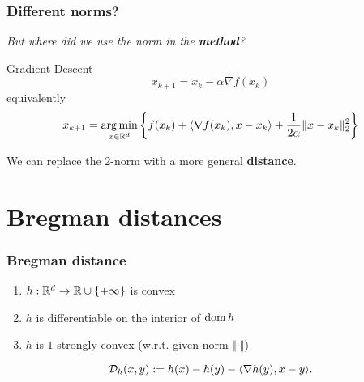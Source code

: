\documentclass{beamer}
\begin{document}
\begin{frame}
  \frametitle{Different norms?}
  \begin{center}
    \textit{But where did we use the norm in the \textbf{method}?}
  \end{center}

  \begin{block}{Gradient Descent}
    \begin{equation}
      x_{k+1} = x_k - \alpha \nabla f(x_k)
    \end{equation}
    equivalently
    \begin{equation}
      x_{k+1} = \operatorname*{arg\,min}_{x \in \mathbb{R}^d} \left\{ f(x_k) + \langle \nabla f(x_k), x-x_k \rangle + \frac{1}{2 \alpha} \Vert x-x_k  \Vert_2^2 \right\}
    \end{equation}
  \end{block}
  We can replace the $2$-norm with a more general \textbf{distance}.
\end{frame}


\section{Bregman distances}%

\begin{frame}
  \frametitle{Bregman distance}

  \begin{enumerate}
    \item $h: \mathbb{R}^d \to \mathbb{R} \cup \{+\infty\}$ is convex
    \item $h$ is differentiable on the interior of $\operatorname*{dom} h$
    \item $h$ is $1$-strongly convex (w.r.t. given norm $\Vert \cdot \Vert$)
  \end{enumerate}

  \begin{block}{}
    \begin{equation}
      \mathcal{D}_h(x,y) := h(x) - h(y) - \langle \nabla h(y), x-y \rangle.
    \end{equation}
  \end{block}

\end{frame}
\end{document}
